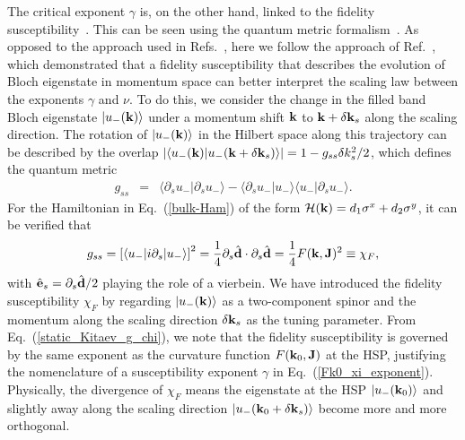 \documentclass[aps,prb,twocolumn,superscriptaddress,groupedaddress]{revtex4}
\begin{document}
The critical exponent  $\gamma$ is, on the other hand,  linked to the fidelity susceptibility~\cite{You07,Zanardi07,Gu10}.
 This can be seen using the quantum metric formalism~\cite{Provost80,Berry89}. 
As opposed to the approach used in Refs.~\cite{Yang08_Kitaev,Gu09_Kitaev,Wang10_Kitaev,Mukherjee12_Kitaev}, here we follow the approach of Ref.~\cite{Panahiyan20}, which demonstrated that a fidelity susceptibility that describes the evolution of Bloch eigenstate in momentum space can better interpret the scaling law between the exponents $\gamma$ and $\nu$. 
To do this, we consider the  change in the filled band Bloch eigenstate $|u_{-}({\bf k})\rangle$  under a  momentum shift ${\bf k}$ to ${\bf k}+\delta{\bf k}_{s}$ along the scaling direction. 
The rotation of $|u_{-}({\bf k})\rangle$ in the Hilbert space along this trajectory can be described by the overlap $|\langle u_{-}({\bf k})|u_{-}({\bf k}+\delta{\bf k}_{s})\rangle|=1-g_{ss}\delta k_{s}^{2}/2$,
which defines the quantum metric 
%
\begin{eqnarray}
g_{ss}&=&\langle\partial_{s}u_{-}|\partial_{s}u_{-}\rangle-\langle\partial_{s}u_{-}|u_{-}\rangle\langle u_{-}|\partial_{s}u_{-}\rangle.
\end{eqnarray}
%
For the Hamiltonian in Eq.~(\ref{bulk-Ham}) of the form ${\cal H}({\bf k})=d_{1}\sigma^{x}+d_{2}\sigma^{y}$, it can be verified that\cite{Panahiyan20}
%
\begin{eqnarray}
g_{ss}=\left[\langle u_{-}|i\partial_{s}|u_{-}\rangle\right]^{2}=\frac{1}{4}\partial_{s}\hat{\bf d}\cdot\partial_{s}\hat{\bf d}=\frac{1}{4}F({\bf k},{\bf J})^{2}\equiv\chi_{F},
\label{static_Kitaev_g_chi}
\end{eqnarray}
%
with ${\hat{\bf e}}_{s}=\partial_{s}\hat{\bf d}/2$ playing the role of a vierbein. 
We have introduced the fidelity susceptibility $\chi_{F}$ by regarding $|u_{-}({\bf k})\rangle$ as a two-component spinor and the momentum along the scaling direction $\delta{\bf k}_{s}$ as the tuning parameter. 
From Eq.~(\ref{static_Kitaev_g_chi}), we note that the fidelity susceptibility is governed by the same exponent as the curvature function $F({\bf k}_{0},{\bf J})$ at the HSP, justifying the nomenclature of a susceptibility exponent $\gamma$ in Eq.~(\ref{Fk0_xi_exponent}). 
Physically, the divergence of $\chi_{F}$ means the eigenstate at the HSP $|u_{-}({\bf k}_{0})\rangle$ and  slightly away along the scaling direction $|u_{-}({\bf k}_{0}+\delta{\bf k}_{s})\rangle$ become more and more orthogonal. 
\end{document}

